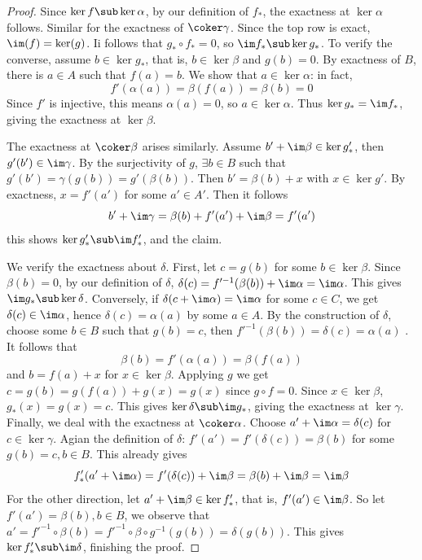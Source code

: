 \begin{proof}
Since $\ker f\sub\ker\alpha$, by our definition of $f_*$, the exactness at $\ker\alpha$ follows. Similar for the exactness of $\coker\gamma$. Since the top row is exact, $\im(f)=\ker(g)$. Ii follows that $g_*\circ f_*=0$, so $\im f_*\sub\ker g_*$. To verify the converse, assume $b\in\ker g_*$, that is, $b\in\ker\beta$ and $g(b)=0$. By exactness of $B$, there is $a\in A$ such that $f(a)=b$. We show that $a\in\ker\alpha$: in fact,
\[f'(\alpha(a))=\beta(f(a))=\beta(b)=0\]
Since $f'$ is injective, this means $\alpha(a)=0$, so $a\in\ker\alpha$. Thus $\ker g_*=\im f_*$, giving the exactness at $\ker\beta$.\par
The exactness at $\coker\beta$ arises similarly. Assume $b'+\im\beta\in\ker g'_*$, then $g'(b')\in\im\gamma$. By the surjectivity of $g$, $\exists b\in B$ such that $g'(b')=\gamma(g(b))=g'(\beta(b))$. Then $b'=\beta(b)+x$ with $x\in\ker g'$. By exactness, $x=f'(a')$ for some $a'\in A'$. Then it follows
\[b'+\im\gamma=\beta(b)+f'(a')+\im\beta=f'(a')\]
this shows $\ker g'_*\sub \im f'_*$, and the claim.\par
We verify the exactness about $\delta$. First, let $c=g(b)$ for some $b\in\ker\beta$. Since $\beta(b)=0$, by our definition of $\delta$, $\delta(c)=f'^{-1}(\beta(b))+\im\alpha=\im\alpha$. This gives $\im g_*\sub\ker\delta$. Conversely, if $\delta(c+\im\alpha)=\im\alpha$ for some $c\in C$, we get $\delta(c)\in\im\alpha$, hence $\delta(c)=\alpha(a)$ by some $a\in A$. By the construction of $\delta$, choose some $b\in B$ such that $g(b)=c$, then $f'^{-1}(\beta(b))=\delta(c)=\alpha(a)$ . It follows that
\[\beta(b)=f'(\alpha(a))=\beta(f(a))\]
and $b=f(a)+x$ for $x\in\ker\beta$. Applying $g$ we get $c=g(b)=g(f(a))+g(x)=g(x)$ since $g\circ f=0$. Since $x\in\ker\beta$, $g_*(x)=g(x)=c$. This gives $\ker\delta\sub\im g_*$, giving the exactness at $\ker\gamma$.
Finally, we deal with the exactness at $\coker\alpha$. Choose $a'+\im\alpha=\delta(c)$ for $c\in\ker\gamma$. Agian the definition of $\delta$: $f'(a')=f'(\delta(c))=\beta(b)$ for some $g(b)=c, b\in B$. This already gives 
\[f'_*(a'+\im\alpha)=f'(\delta(c))+\im\beta=\beta(b)+\im\beta=\im\beta\]
For the other direction, let $a'+\im\beta\in\ker f'_*$, that is, $f'(a')\in\im\beta$. So let $f'(a')=\beta(b), b\in B$, we observe that $a'=f'^{-1}\circ\beta(b)=f'^{-1}\circ\beta\circ g^{-1}(g(b))=\delta(g(b))$. This gives $\ker f'_*\sub\im\delta$, finishing the proof.
\end{proof}
